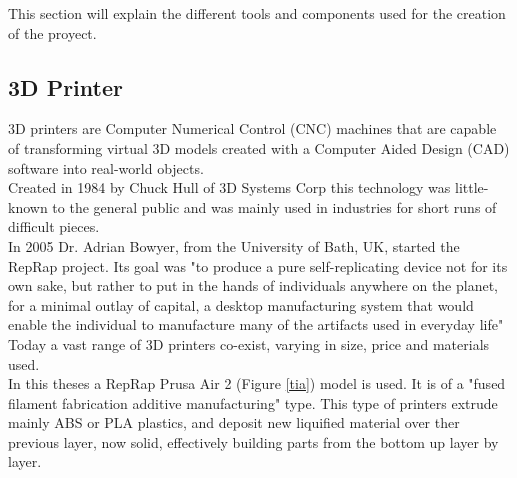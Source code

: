 This section will explain the different tools and components used for the creation of the proyect.


\subsection{3D Printer}

	3D printers are Computer Numerical Control (CNC) machines that are capable of transforming virtual 3D models created with a Computer Aided Design (CAD) software into real-world objects.\\

	Created in 1984 by Chuck Hull of 3D Systems Corp this technology was little-known to the general public and was mainly used in industries for short runs of difficult pieces.\\
	In 2005 Dr. Adrian Bowyer, from the University of Bath, UK, started the RepRap project. Its goal was "to produce a pure self-replicating device not for its own sake, but rather to put in the hands of individuals anywhere on the planet, for a minimal outlay of capital, a desktop manufacturing system that would enable the individual to manufacture many of the artifacts used in everyday life" \\

	Today a vast range of 3D printers co-exist, varying in size, price and materials used. \\




	In this theses a RepRap Prusa Air 2 (Figure \ref{tia}) model is used. It is of a "fused filament fabrication additive manufacturing" type. This type of printers extrude mainly ABS or PLA plastics, and deposit new liquified material over ther previous layer, now solid, effectively building parts from the bottom up layer by layer.\\

